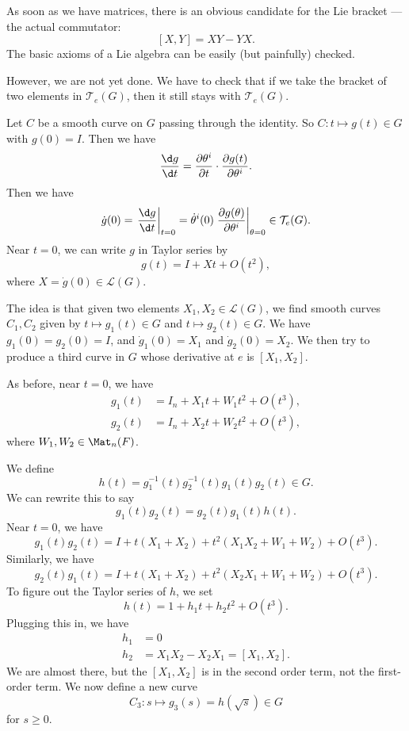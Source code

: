 \documentclass[a4paper]{article}
\begin{document}
As soon as we have matrices, there is an obvious candidate for the Lie bracket --- the actual commutator:
\[
  [X, Y] = XY - YX.
\]
The basic axioms of a Lie algebra can be easily (but painfully) checked.

However, we are not yet done. We have to check that if we take the bracket of two elements in $\mathcal{T}_e(G)$, then it still stays with $\mathcal{T}_e(G)$.

Let $C$ be a smooth curve on $G$ passing through the identity. So $C: t \mapsto g(t) \in G$ with $g(0) = I$. Then we have
\[
  \frac{\d g}{\d t} = \frac{\partial \theta^i}{\partial t} \cdot \frac{\partial g(t)}{\partial \theta^i}.
\]
Then we have
\[
  \dot{g}(0) = \left.\frac{\d g}{\d t}\right|_{t = 0} = \dot{\theta}^i(0) \left.\frac{\partial g(\theta)}{\partial \theta^i}\right|_{\theta = 0} \in \mathcal{T}_e (G).
\]
Near $t = 0$, we can write $g$ in Taylor series by
\[
  g(t) = I + Xt + O(t^2),
\]
where $X = \dot{g}(0) \in \mathcal{L}(G)$.

The idea is that given two elements $X_1, X_2 \in \mathcal{L}(G)$, we find smooth curves $C_1, C_2$ given by $t \mapsto g_1(t) \in G$ and $t \mapsto g_2(t) \in G$. We have $g_1(0) = g_2(0) = I$, and $\dot{g}_1(0) = X_1$ and $\dot{g}_2(0) = X_2$. We then try to produce a third curve in $G$ whose derivative at $e$ is $[X_1, X_2]$.

As before, near $t = 0$, we have
\begin{align*}
  g_1(t) &= I_n + X_1 t + W_1 t^2 + O(t^3),\\
  g_2(t) &= I_n + X_2 t + W_2 t^2 + O(t^3),
\end{align*}
where $W_1, W_2 \in \Mat_n(F)$.

We define
\[
  h(t) = g_1^{-1}(t) g_2^{-1}(t) g_1(t) g_2(t) \in G.
\]
We can rewrite this to say
\[
  g_1(t) g_2(t) = g_2(t) g_1(t) h(t).
\]
Near $t = 0$, we have
\[
  g_1(t) g_2(t) = I + t(X_1 + X_2) + t^2 (X_1 X_2 + W_1 + W_2) + O(t^3).
\]
Similarly, we have
\[
  g_2(t) g_1(t) = I + t(X_1 + X_2) + t^2 (X_2 X_1 + W_1 + W_2) + O(t^3).
\]
To figure out the Taylor series of $h$, we set
\[
  h(t) = 1 + h_1 t + h_2 t^2 + O(t^3).
\]
Plugging this in, we have
\begin{align*}
  h_1 &= 0\\
  h_2 &= X_1 X_2 - X_2 X_1 = [X_1, X_2].
\end{align*}
We are almost there, but the $[X_1, X_2]$ is in the second order term, not the first-order term. We now define a new curve
\[
  C_3: s \mapsto g_3(s) = h(\sqrt{s}) \in G
\]
for $s \geq 0$.
\end{document}
